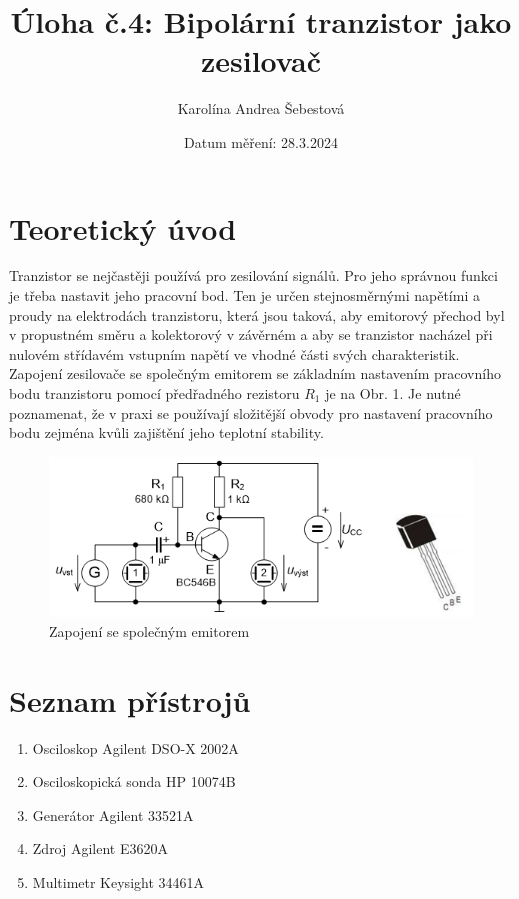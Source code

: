 \documentclass[a4paper, czech]{article}
\title{Úloha č.4: Bipolární tranzistor jako zesilovač}
\author{Karolína Andrea Šebestová}
\date{Datum měření: 28.3.2024}
\begin{document}
\maketitle

\section{Teoretický úvod}

Tranzistor se nejčastěji používá pro zesilování signálů. Pro jeho správnou funkci je třeba nastavit jeho pracovní bod. Ten je určen stejnosměrnými napětími a proudy na elektrodách tranzistoru, která jsou taková, aby emitorový přechod byl v propustném směru a kolektorový v závěrném a aby se tranzistor nacházel při nulovém střídavém vstupním napětí ve vhodné části svých charakteristik. Zapojení zesilovače se společným emitorem se základním nastavením pracovního bodu tranzistoru pomocí předřadného rezistoru $R_1$ je na Obr. 1. Je nutné poznamenat, že v praxi se používají složitější obvody pro nastavení pracovního bodu zejména kvůli zajištění jeho teplotní stability.

\begin{figure}[H]
    \centering
    \includegraphics{zapojeni_SE.png}
    \caption{Zapojení se společným emitorem}
\end{figure}

\section{Seznam přístrojů}

\begin{enumerate}
    \item Osciloskop Agilent DSO-X 2002A
    \item Osciloskopická sonda HP 10074B
    \item Generátor Agilent 33521A
    \item Zdroj Agilent E3620A
    \item Multimetr Keysight 34461A
\end{enumerate}
\end{document}
